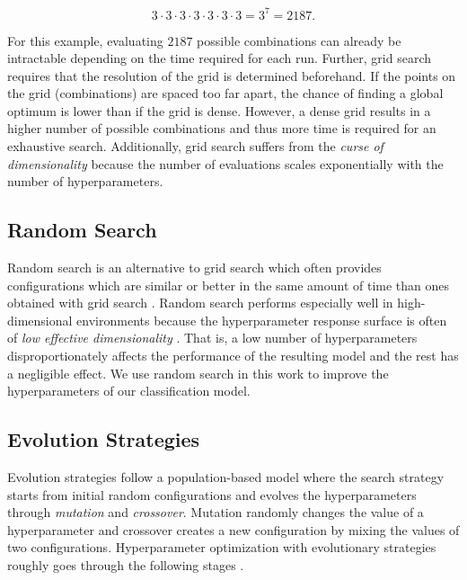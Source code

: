 \documentclass[final]{vutinfth} %
\begin{document}
\begin{equation}
  \label{eq:hypopt-nums}
  3\cdot3\cdot3\cdot3\cdot3\cdot3\cdot3 = 3^{7} = 2187.
\end{equation}

For this example, evaluating $2187$ possible combinations can already
be intractable depending on the time required for each run. Further,
grid search requires that the resolution of the grid is determined
beforehand. If the points on the grid (combinations) are spaced too
far apart, the chance of finding a global optimum is lower than if the
grid is dense. However, a dense grid results in a higher number of
possible combinations and thus more time is required for an exhaustive
search. Additionally, grid search suffers from the \emph{curse of
dimensionality} because the number of evaluations scales exponentially
with the number of hyperparameters.

\subsection{Random Search}
\label{ssec:hypopt-random-search}

Random search \cite{pinto2009} is an alternative to grid search which
often provides configurations which are similar or better in the same
amount of time than ones obtained with grid search
\cite{bergstra2012}. Random search performs especially well in
high-dimensional environments because the hyperparameter response
surface is often of \emph{low effective dimensionality}
\cite{bergstra2012}. That is, a low number of hyperparameters
disproportionately affects the performance of the resulting model and
the rest has a negligible effect. We use random search in this work to
improve the hyperparameters of our classification model.

\subsection{Evolution Strategies}
\label{ssec:hypopt-evo}

Evolution strategies follow a population-based model where the search
strategy starts from initial random configurations and evolves the
hyperparameters through \emph{mutation} and \emph{crossover}. Mutation
randomly changes the value of a hyperparameter and crossover creates a
new configuration by mixing the values of two
configurations. Hyperparameter optimization with evolutionary
strategies roughly goes through the following stages
\cite{bischl2023}.
\end{document}
